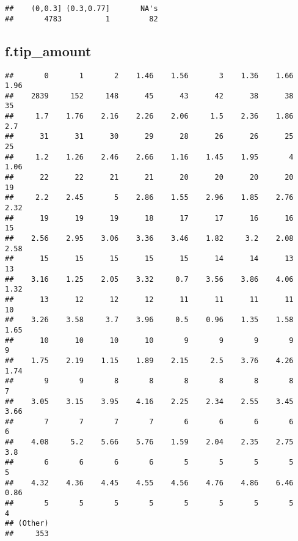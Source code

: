 \documentclass[]{article}
\newenvironment{Shaded}{\begin{snugshade}}{\end{snugshade}}
\newcommand{\KeywordTok}[1]{\textcolor[rgb]{0.13,0.29,0.53}{\textbf{{#1}}}}
\newcommand{\CommentTok}[1]{\textcolor[rgb]{0.56,0.35,0.01}{\textit{{#1}}}}
\newcommand{\NormalTok}[1]{{#1}}
\begin{document}
\begin{verbatim}
##    (0,0.3] (0.3,0.77]       NA's 
##       4783          1         82
\end{verbatim}

\subsection{f.tip\_amount}\label{f.tip_amount}

\begin{Shaded}
\end{Shaded}

\begin{verbatim}
##       0       1       2    1.46    1.56       3    1.36    1.66    1.96 
##    2839     152     148      45      43      42      38      38      35 
##     1.7    1.76    2.16    2.26    2.06     1.5    2.36    1.86     2.7 
##      31      31      30      29      28      26      26      25      25 
##     1.2    1.26    2.46    2.66    1.16    1.45    1.95       4    1.06 
##      22      22      21      21      20      20      20      20      19 
##     2.2    2.45       5    2.86    1.55    2.96    1.85    2.76    2.32 
##      19      19      19      18      17      17      16      16      15 
##    2.56    2.95    3.06    3.36    3.46    1.82     3.2    2.08    2.58 
##      15      15      15      15      15      14      14      13      13 
##    3.16    1.25    2.05    3.32     0.7    3.56    3.86    4.06    1.32 
##      13      12      12      12      11      11      11      11      10 
##    3.26    3.58     3.7    3.96     0.5    0.96    1.35    1.58    1.65 
##      10      10      10      10       9       9       9       9       9 
##    1.75    2.19    1.15    1.89    2.15     2.5    3.76    4.26    1.74 
##       9       9       8       8       8       8       8       8       7 
##    3.05    3.15    3.95    4.16    2.25    2.34    2.55    3.45    3.66 
##       7       7       7       7       6       6       6       6       6 
##    4.08     5.2    5.66    5.76    1.59    2.04    2.35    2.75     3.8 
##       6       6       6       6       5       5       5       5       5 
##    4.32    4.36    4.45    4.55    4.56    4.76    4.86    6.46    0.86 
##       5       5       5       5       5       5       5       5       4 
## (Other) 
##     353
\end{verbatim}
\end{document}
